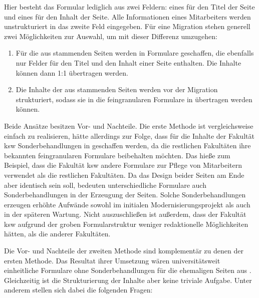         Hier besteht das Formular lediglich aus zwei Feldern:
        eines für den Titel der Seite und eines für den Inhalt der Seite.
        Alle Informationen eines Mitarbeiters werden unstrukturiert in das zweite Feld eingegeben.
        Für eine Migration stehen generell zwei Möglichkeiten zur Auswahl,
        um mit dieser Differenz umzugehen:

        \begin{enumerate}
            \item   Für die aus {\wordpress} stammenden Seiten werden in {\imperia} Formulare geschaffen,
                    die ebenfalls nur Felder für den Titel und den Inhalt einer Seite enthalten.
                    Die Inhalte können dann 1:1 übertragen werden.
            \item   Die Inhalte der aus {\wordpress} stammenden Seiten werden vor der Migration strukturiert,
                    sodass sie in die feingranularen Formulare in {\imperia} übertragen werden können.
        \end{enumerate}

        Beide Ansätze besitzen Vor- und Nachteile.
        Die erste Methode ist vergleichsweise einfach zu realisieren,
        hätte allerdings zur Folge, dass für die Inhalte der Fakultät \gls{ksw} Sonderbehandlungen
        in {\imperia} geschaffen werden, da die restlichen Fakultäten ihre bekannten feingranularen
        Formulare beibehalten möchten.
        Das hieße zum Beispiel, dass die Fakultät \gls{ksw} andere Formulare zur Pflege von Mitarbeitern
        verwendet als die restlichen Fakultäten.
        Da das Design beider Seiten am Ende aber identisch sein soll, bedeuten unterschiedliche Formulare
        auch Sonderbehandlungen in der Erzeugung der Seiten.
        Solche Sonderbehandlungen erzeugen erhöhte Aufwände sowohl im initialen Modernisierungsprojekt
        als auch in der späteren Wartung.
        Nicht auszuschließen ist außerdem, dass {\editors} der Fakultät \gls{ksw} aufgrund der groben Formularstruktur
        weniger redaktionelle Möglichkeiten hätten, als die anderer Fakultäten.

        Die Vor- und Nachteile der zweiten Methode sind komplementär zu denen der ersten Methode.
        Das Resultat ihrer Umsetzung wären universitätsweit einheitliche Formulare
        ohne Sonderbehandlungen für die ehemaligen Seiten aus {\wordpress}.
        Gleichzeitig ist die Strukturierung der Inhalte aber keine triviale Aufgabe.
        Unter anderem stellen sich dabei die folgenden Fragen:

